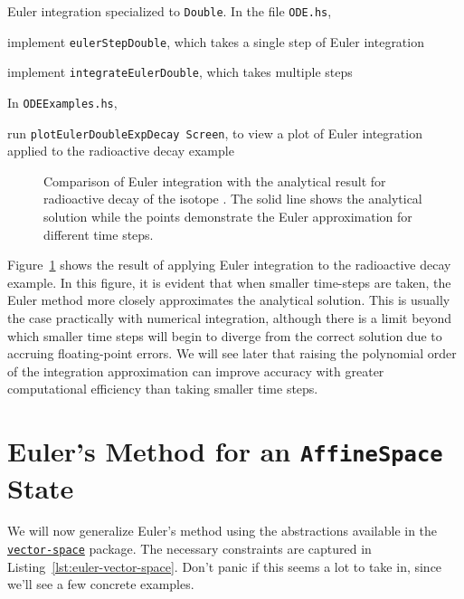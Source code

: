 \documentclass[12pt,openany]{book}
\newcommand{\filename}[1]{\texttt{#1}}  %
\newcommand{\code}[1]{\texttt{#1}}      %
\newcommand{\hspackage}[1]{\href{http://hackage.haskell.org/package/#1}{\texttt{#1}}}
\begin{document}
\begin{problem}[label=eulerStepDouble]{Euler integration specialized to \code{Double}.}
  In the file \filename{ODE.hs},
  \begin{probitemize}
  \item implement \code{eulerStepDouble}, which takes a single step of Euler integration
  \item implement \code{integrateEulerDouble}, which takes multiple steps
  \end{probitemize}
  In \filename{ODEExamples.hs},
  \begin{probitemize}
  \item run \code{plotEulerDoubleExpDecay Screen}, to view a plot of Euler integration applied to the radioactive decay example
  \end{probitemize}
\end{problem}

\begin{figure}[htbp]
  \centering
  \resizebox{\textwidth}{!}{}
  \caption{Comparison of Euler integration with the analytical result for radioactive decay of the isotope . The solid line shows the analytical solution while the points demonstrate the Euler approximation for different time steps.}
  \label{fig:euler-double-exp-decay}
\end{figure}

Figure~\ref{fig:euler-double-exp-decay} shows the result of applying Euler integration to the radioactive decay example. In this figure, it is evident that when smaller time-steps are taken, the Euler method more closely approximates the analytical solution. This is usually the case practically with numerical integration, although there is a limit beyond which smaller time steps will begin to diverge from the correct solution due to accruing floating-point errors. We will see later that raising the polynomial order of the integration approximation can improve accuracy with greater computational efficiency than taking smaller time steps.

\section{Euler's Method for an \code{AffineSpace} State}

We will now generalize Euler's method using the abstractions available in the \hspackage{vector-space} package. The necessary constraints are captured in Listing~\ref{lst:euler-vector-space}. Don't panic if this seems a lot to take in, since we'll see a few concrete examples.
\end{document}
